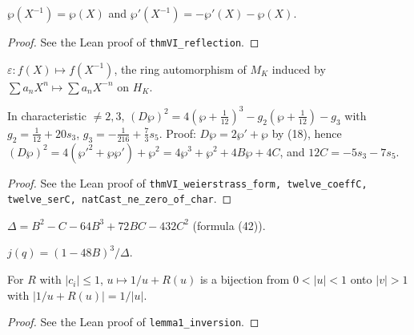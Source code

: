 \begin{theorem}
\label{thm:VI-reflection}
\leanok
$\wp(X^{-1})=\wp(X)$ and $\wp'(X^{-1})=-\wp'(X)-\wp(X)$.
\end{theorem}
\begin{proof}
\leanok
See the Lean proof of \texttt{thmVI\_reflection}.
\end{proof}

\begin{definition}[Reflection]
\label{def:reflection}
\leanok
$\varepsilon:f(X)\mapsto f(X^{-1})$, the ring automorphism of $M_K$ induced by $\sum a_nX^n\mapsto\sum a_nX^{-n}$ on $H_K$.
\end{definition}

\begin{remark}
\label{rem:normal-form-3}
\leanok
In characteristic $\neq 2,3$, $(D\wp)^2=4(\wp+\tfrac1{12})^3-g_2(\wp+\tfrac1{12})-g_3$ with $g_2=\tfrac1{12}+20s_3$, $g_3=-\tfrac1{216}+\tfrac73s_5$. Proof: $D\wp=2\wp'+\wp$ by (18), hence $(D\wp)^2=4(\wp'^2+\wp\wp')+\wp^2=4\wp^3+\wp^2+4B\wp+4C$, and $12C=-5s_3-7s_5$.
\end{remark}
\begin{proof}
\leanok
See the Lean proof of \texttt{thmVI\_weierstrass\_form, twelve\_coeffC, twelve\_serC, natCast\_ne\_zero\_of\_char}.
\end{proof}

\begin{definition}
\label{def:Delta-q}
\leanok
$\Delta=B^2-C-64B^3+72BC-432C^2$ (formula (42)).
\end{definition}

\begin{definition}
\label{def:jq}
\leanok
$j(q)=(1-48B)^3/\Delta$.
\end{definition}

\begin{lemma}
\label{lem:1}
\leanok
For $R$ with $|c_i|\le 1$, $u\mapsto 1/u+R(u)$ is a bijection from $0<|u|<1$ onto $|v|>1$ with $|1/u+R(u)|=1/|u|$.
\end{lemma}
\begin{proof}
\leanok
See the Lean proof of \texttt{lemma1\_inversion}.
\end{proof}

